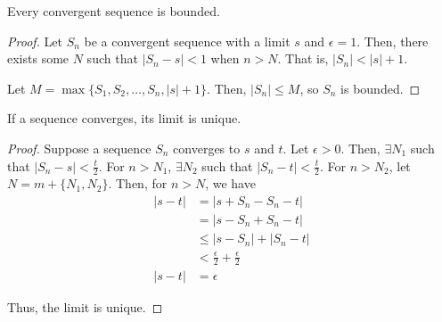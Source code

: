 \begin{theorem}
    Every convergent sequence is bounded.
\end{theorem}
\begin{proof}
    Let $S_n$ be a convergent sequence with a limit $s$ and $\epsilon = 1$. Then, there exists some $N$ such that $|S_n - s| < 1$ when $n > N$. That is, $|S_n| < |s| + 1$.

    Let $M = \max\{S_1, S_2, \ldots, S_n, |s| + 1\}$. Then, $|S_n| \leq M$, so $S_n$ is bounded.
\end{proof}

\begin{theorem}
    If a sequence converges, its limit is unique.
\end{theorem}
\begin{proof}
    Suppose a sequence $S_n$ converges to $s$ and $t$. Let $\epsilon > 0$. Then, $\exists N_1$ such that $|S_n - s| < \frac{t}{2}$. For $n > N_1$, $\exists N_2$ such that $|S_n - t| < \frac{t}{2}$. For $n > N_2$, let $N = m + \{N_1, N_2\}$. Then, for $n > N$, we have
    \begin{align*}
        |s - t| &= |s + S_n - S_n - t| \\
        &= |s - S_n + S_n - t| \\
        &\leq |s - S_n| + |S_n - t| \\
        &< \frac{\epsilon}{2} + \frac{\epsilon}{2} \\
        |s - t| &= \epsilon
    \end{align*}

    Thus, the limit is unique.
\end{proof}